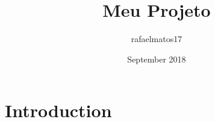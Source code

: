 \documentclass{article}
\title{Meu Projeto}
\author{rafaelmatos17 }
\date{September 2018}
\begin{document}
\maketitle

\section{Introduction}
\end{document}
